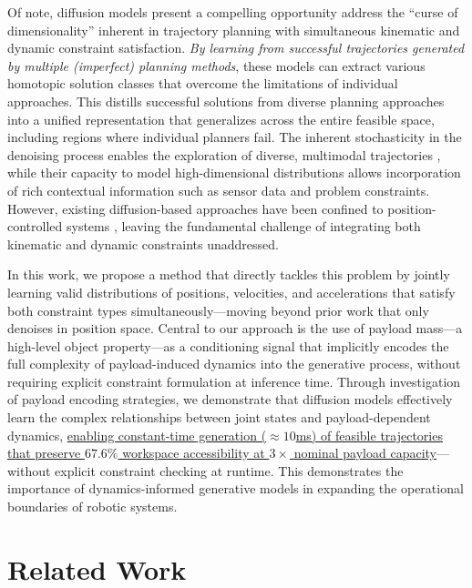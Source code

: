 Of note, diffusion models \cite{chi2023diffusionpolicy,sridhar2024nomad} present a compelling opportunity
address the ``curse of dimensionality'' inherent in trajectory planning with simultaneous kinematic and dynamic constraint satisfaction.
\textit{By learning from successful trajectories generated by multiple (imperfect) planning methods}, these models can extract various homotopic solution classes that overcome the limitations of individual approaches.
This distills successful solutions from diverse planning approaches into a unified representation that generalizes across the entire feasible space, including regions where individual planners fail.
The inherent stochasticity in the denoising process enables the exploration of diverse, multimodal trajectories \cite{chi2023diffusionpolicy}, while their capacity to model high-dimensional distributions allows incorporation of rich contextual information such as sensor data and problem constraints.
However, existing diffusion-based approaches have been confined to position-controlled systems \cite{carvalho2023motion,saha2024edmp}, leaving the fundamental challenge of integrating both kinematic and dynamic constraints unaddressed.

In this work, we propose a method that directly tackles this problem by jointly learning valid distributions of positions, velocities, and accelerations that satisfy both constraint types simultaneously---moving beyond prior work that only denoises in position space.
Central to our approach is the use of payload mass---a high-level object property---as a conditioning signal that implicitly encodes the full complexity of payload-induced dynamics into the generative process, without requiring explicit constraint formulation at inference time.
Through investigation of payload encoding strategies, we demonstrate that diffusion models effectively learn the complex relationships between joint states and payload-dependent dynamics, \uline{enabling constant-time generation ($\approx 10$ms) of feasible trajectories that preserve $67.6\%$ workspace accessibility at $3\times$ nominal payload capacity}---without explicit constraint checking at runtime. This demonstrates the importance of dynamics-informed generative models in expanding the operational boundaries of robotic systems.

\section{Related Work}
\label{sec:payload:related}

